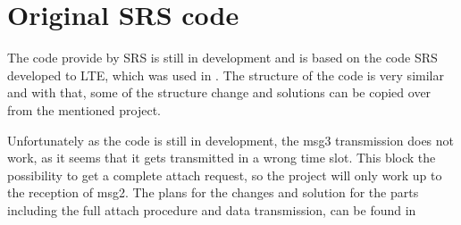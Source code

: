 




\section{Original SRS code}
The code provide by SRS is still in development and is based on the code SRS developed to LTE, which was used in \citep{thesis_report}. The structure of the code is very similar and with that, some of the structure change and solutions can be copied over from the mentioned project.

Unfortunately as the code is still in development, the msg3 transmission does not work, as it seems that it gets transmitted in a wrong time slot.  This block the possibility to get a complete attach request, so the project will only work up to the reception of msg2. The plans for the changes and solution for the parts including the full attach procedure and data transmission, can be found in 

